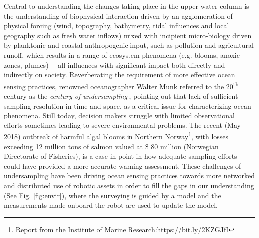 \documentclass[aoas]{imsart}
\begin{document}

Central to understanding the changes taking place in the upper water-column is the understanding of biophysical interaction  driven by an agglomeration of physical forcing (wind, topography, bathymetry, tidal influences and local geography such as fresh water inflows) mixed with incipient micro-biology driven by planktonic and coastal anthropogenic input, such as pollution and agricultural runoff, which results in a range of ecosystem phenomena (e.g. blooms, anoxic zones, plumes) ---all influences with significant impact both directly and indirectly on society. Reverberating the requirement of more effective ocean sensing practices, renowned oceanographer Walter Munk referred to the 20\textsuperscript{th} century as the \emph{century of undersampling} \citep{munk2002}, pointing out that lack of sufficient sampling resolution in time and space, as a critical issue for characterizing ocean phenomena. Still today, decision makers struggle with limited observational efforts sometimes leading to severe environmental problems. The recent (May 2018) outbreak of harmful algal blooms in Northern Norway\footnote{Report from the Institute of Marine Research:https://bit.ly/2KZGJfI}, with losses exceeding 12 million tons of salmon valued at \$ 80 million (Norwegian Directorate of Fisheries), is a case in point in how adequate sampling efforts could have provided a more accurate warning assessment. These challenges of undersampling have been driving ocean sensing practices towards more networked and distributed use of robotic assets in order to fill the gaps in our understanding (See Fig. \ref{fig:envir}), where the surveying is guided by a model and the measurements made onboard the robot are used to update the model.
\end{document}
